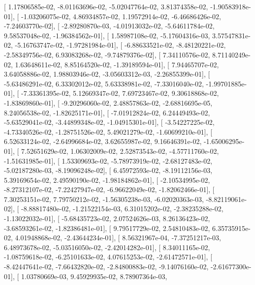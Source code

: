 \documentclass{article}
\begin{document}
       [  1.17806585e-02,  -8.01163696e-02,  -5.02047764e-02,
          3.81374358e-02,  -1.90583918e-01],
       [ -1.03206075e-02,   4.86934857e-02,   1.19572914e-02,
         -6.46686426e-02,  -7.24603770e-02],
       [ -2.89280870e-03,  -4.01913032e-02,  -5.64611784e-02,
          9.58537048e-02,  -1.96384562e-01],
       [  1.58987108e-02,  -5.17604316e-03,   3.57547831e-02,
         -5.16763747e-02,  -1.97281984e-01],
       [ -6.88633521e-02,  -8.48120221e-02,  -2.58349756e-02,
          6.93083268e-02,  -9.74879376e-02],
       [  7.34110576e-02,   8.71140249e-02,   1.63648611e-02,
          8.85164520e-02,  -1.39189594e-01],
       [  7.94465707e-02,   3.64058886e-02,   1.98803946e-02,
         -3.05603312e-03,  -2.26855399e-01],
       [ -5.63486291e-02,   6.33302012e-02,   5.63338981e-02,
         -7.33016040e-02,  -1.99701885e-01],
       [ -7.33361395e-02,   5.12669347e-02,   7.69723467e-02,
          9.30618868e-02,  -1.83869860e-01],
       [ -9.20296060e-02,   2.48857863e-02,  -2.68816695e-05,
          8.24056538e-02,  -1.82625171e-01],
       [ -7.01912824e-02,   6.24449493e-02,  -5.63529041e-02,
         -3.44899348e-02,  -1.04915301e-01],
       [ -3.54227225e-02,  -4.73340526e-02,  -1.28751526e-02,
          5.49021279e-02,  -1.60699210e-01],
       [  6.52633124e-02,  -2.64996684e-02,   3.62655987e-02,
          9.16646391e-02,  -1.65006295e-01],
       [  7.52651629e-02,   1.06302009e-02,   2.52873543e-02,
         -4.57711760e-02,  -1.51631985e-01],
       [  1.53309693e-02,  -5.78973919e-02,  -2.68127483e-02,
         -5.02187280e-03,  -8.19096248e-02],
       [  6.45972593e-02,  -8.19112156e-03,   5.39169654e-02,
          2.49590190e-02,  -1.98184862e-01],
       [ -2.10534995e-02,  -8.27312107e-02,  -7.22427947e-02,
         -6.96622049e-02,  -1.82062466e-01],
       [  7.30253151e-02,   7.79750212e-02,  -1.56305238e-03,
         -6.02020363e-03,  -8.82119061e-02],
       [ -8.88817480e-02,  -1.21522154e-03,   6.31015202e-02,
         -2.38235288e-02,  -1.13022032e-01],
       [ -5.68435723e-02,   2.07524626e-03,   8.26136423e-02,
         -3.68593261e-02,  -1.82386481e-01],
       [  9.79517729e-02,   2.54810483e-02,   6.35735915e-02,
          4.01948868e-02,  -2.43644234e-01],
       [  8.56321967e-04,  -7.37251217e-03,   6.48973678e-02,
         -5.03516050e-02,  -2.42014282e-01],
       [  8.34011165e-02,  -1.08759618e-02,  -6.25101633e-02,
          4.07615253e-02,  -2.61472571e-01],
       [ -8.42447641e-02,  -7.66432820e-02,  -2.84800883e-02,
         -9.14076160e-02,  -2.61677300e-01],
       [  1.03780669e-03,   9.45929935e-02,   8.78907364e-03,
\end{document}
